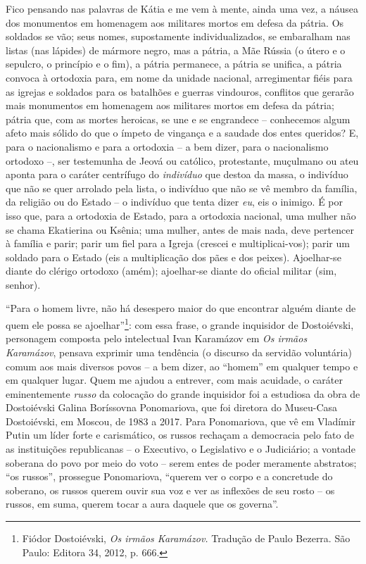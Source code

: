 Fico pensando nas palavras de Kátia e me vem à mente, ainda uma vez, a
náusea dos monumentos em homenagem aos militares mortos em defesa da
pátria. Os soldados se vão; seus nomes, supostamente individualizados,
se embaralham nas listas (nas lápides) de mármore negro, mas a pátria, a
Mãe Rússia (o útero e o sepulcro, o princípio e o fim), a pátria
permanece, a pátria se unifica, a pátria convoca à ortodoxia para, em
nome da unidade nacional, arregimentar fiéis para as igrejas e soldados
para os batalhões e guerras vindouros, conflitos que gerarão mais
monumentos em homenagem aos militares mortos em defesa da pátria; pátria
que, com as mortes heroicas, se une e se engrandece -- conhecemos algum
afeto mais sólido do que o ímpeto de vingança e a saudade dos entes
queridos? E, para o nacionalismo e para a ortodoxia -- a bem dizer, para
o nacionalismo ortodoxo --, ser testemunha de Jeová ou católico,
protestante, muçulmano ou ateu aponta para o caráter centrífugo do
\emph{indivíduo} que destoa da massa, o indivíduo que não se quer
arrolado pela lista, o indivíduo que não se vê membro da família, da
religião ou do Estado -- o indivíduo que tenta dizer \emph{eu}, eis o
inimigo. É por isso que, para a ortodoxia de Estado, para a ortodoxia
nacional, uma mulher não se chama Ekatierina ou Ksênia; uma mulher,
antes de mais nada, deve pertencer à família e parir; parir um fiel para
a Igreja (crescei e multiplicai-vos); parir um soldado para o Estado
(eis a multiplicação dos pães e dos peixes). Ajoelhar-se diante do
clérigo ortodoxo (amém); ajoelhar-se diante do oficial militar (sim,
senhor).

``Para o homem livre, não há desespero maior do que encontrar alguém
diante de quem ele possa se ajoelhar''\footnote{Fiódor Dostoiévski,
  \emph{Os irmãos Karamázov.} Tradução de Paulo Bezerra. São Paulo:
  Editora 34, 2012, p. 666.}: com essa frase, o grande inquisidor de
Dostoiévski, personagem composta pelo intelectual Ivan Karamázov em
\emph{Os irmãos Karamázov}, pensava exprimir uma tendência (o discurso
da servidão voluntária) comum aos mais diversos povos -- a bem dizer, ao
``homem'' em qualquer tempo e em qualquer lugar. Quem me ajudou a
entrever, com mais acuidade, o caráter eminentemente \emph{russo} da
colocação do grande inquisidor foi a estudiosa da obra de Dostoiévski
Galina Boríssovna Ponomariova, que foi diretora do Museu-Casa
Dostoiévski, em Moscou, de 1983 a 2017. Para Ponomariova, que vê em
Vladímir Putin um líder forte e carismático, os russos rechaçam a
democracia pelo fato de as instituições republicanas -- o Executivo, o
Legislativo e o Judiciário; a vontade soberana do povo por meio do voto
-- serem entes de poder meramente abstratos; ``os russos'', prossegue
Ponomariova, ``querem ver o corpo e a concretude do soberano, os russos
querem ouvir sua voz e ver as inflexões de seu rosto -- os russos, em
suma, querem tocar a aura daquele que os governa''.

